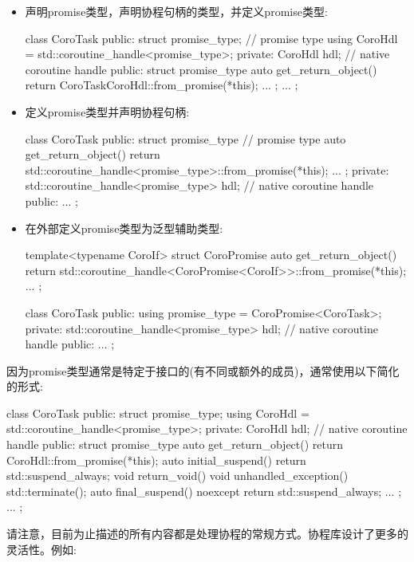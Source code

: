\begin{itemize}
\item 
声明promise类型，声明协程句柄的类型，并定义promise类型:

\begin{cpp}
class CoroTask {
public:
	struct promise_type; // promise type
	using CoroHdl = std::coroutine_handle<promise_type>;
private:
	CoroHdl hdl; // native coroutine handle
public:
	struct promise_type {
		auto get_return_object() {
			return CoroTask{CoroHdl::from_promise(*this)};
		}
		...
	};
	...
};
\end{cpp}

\item 
定义promise类型并声明协程句柄:

\begin{cpp}
class CoroTask {
public:
	struct promise_type { // promise type
		auto get_return_object() {
			return std::coroutine_handle<promise_type>::from_promise(*this);
		}
		...
	};
private:
	std::coroutine_handle<promise_type> hdl; // native coroutine handle
	public:
	...
};
\end{cpp}

\item 
在外部定义promise类型为泛型辅助类型:

\begin{cpp}
template<typename CoroIf>
struct CoroPromise {
	auto get_return_object() {
		return std::coroutine_handle<CoroPromise<CoroIf>>::from_promise(*this);
	}
	...
};

class CoroTask {
	public:
	using promise_type = CoroPromise<CoroTask>;
	private:
	std::coroutine_handle<promise_type> hdl; // native coroutine handle
	public:
	...
};
\end{cpp}
\end{itemize}

因为promise类型通常是特定于接口的(有不同或额外的成员)，通常使用以下简化的形式:

\begin{cpp}
class CoroTask {
public:
	struct promise_type;
	using CoroHdl = std::coroutine_handle<promise_type>;
private:
	CoroHdl hdl; // native coroutine handle
public:
	struct promise_type {
		auto get_return_object() { return CoroHdl::from_promise(*this); }
		auto initial_suspend() { return std::suspend_always{}; }
		void return_void() { }
		void unhandled_exception() { std::terminate(); }
		auto final_suspend() noexcept { return std::suspend_always{}; }
		...
	};
	...
};
\end{cpp}

请注意，目前为止描述的所有内容都是处理协程的常规方式。协程库设计了更多的灵活性。例如:

